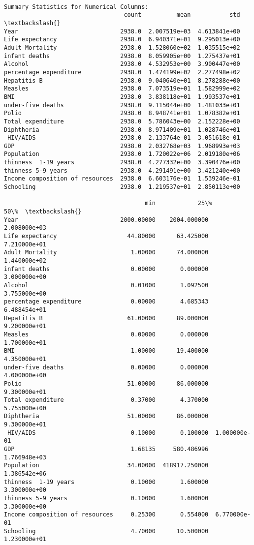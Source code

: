 \documentclass[11pt]{article}
\begin{document}
    \begin{Verbatim}[commandchars=\\\{\}]

Summary Statistics for Numerical Columns:
                                  count          mean           std  \textbackslash{}
Year                             2938.0  2.007519e+03  4.613841e+00
Life expectancy                  2938.0  6.940371e+01  9.295013e+00
Adult Mortality                  2938.0  1.528060e+02  1.035515e+02
infant deaths                    2938.0  8.059905e+00  1.275437e+01
Alcohol                          2938.0  4.532953e+00  3.900447e+00
percentage expenditure           2938.0  1.474199e+02  2.277498e+02
Hepatitis B                      2938.0  9.040640e+01  8.278288e+00
Measles                          2938.0  7.073519e+01  1.582999e+02
BMI                              2938.0  3.838118e+01  1.993537e+01
under-five deaths                2938.0  9.115044e+00  1.481033e+01
Polio                            2938.0  8.948741e+01  1.078382e+01
Total expenditure                2938.0  5.786043e+00  2.152228e+00
Diphtheria                       2938.0  8.971409e+01  1.028746e+01
 HIV/AIDS                        2938.0  2.133764e-01  3.051618e-01
GDP                              2938.0  2.032768e+03  1.968993e+03
Population                       2938.0  1.720022e+06  2.019180e+06
thinness  1-19 years             2938.0  4.277332e+00  3.390476e+00
thinness 5-9 years               2938.0  4.291491e+00  3.421240e+00
Income composition of resources  2938.0  6.603176e-01  1.539246e-01
Schooling                        2938.0  1.219537e+01  2.850113e+00

                                        min            25\%           50\%  \textbackslash{}
Year                             2000.00000    2004.000000  2.008000e+03
Life expectancy                    44.80000      63.425000  7.210000e+01
Adult Mortality                     1.00000      74.000000  1.440000e+02
infant deaths                       0.00000       0.000000  3.000000e+00
Alcohol                             0.01000       1.092500  3.755000e+00
percentage expenditure              0.00000       4.685343  6.488454e+01
Hepatitis B                        61.00000      89.000000  9.200000e+01
Measles                             0.00000       0.000000  1.700000e+01
BMI                                 1.00000      19.400000  4.350000e+01
under-five deaths                   0.00000       0.000000  4.000000e+00
Polio                              51.00000      86.000000  9.300000e+01
Total expenditure                   0.37000       4.370000  5.755000e+00
Diphtheria                         51.00000      86.000000  9.300000e+01
 HIV/AIDS                           0.10000       0.100000  1.000000e-01
GDP                                 1.68135     580.486996  1.766948e+03
Population                         34.00000  418917.250000  1.386542e+06
thinness  1-19 years                0.10000       1.600000  3.300000e+00
thinness 5-9 years                  0.10000       1.600000  3.300000e+00
Income composition of resources     0.25300       0.554000  6.770000e-01
Schooling                           4.70000      10.500000  1.230000e+01


\end{Verbatim}
\end{document}
